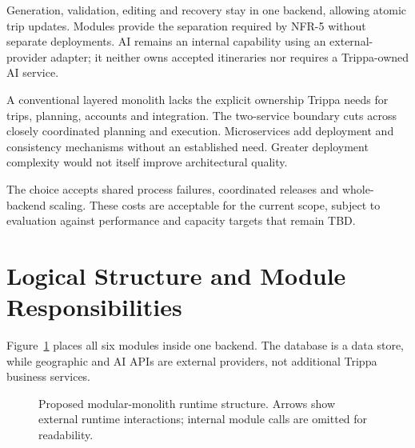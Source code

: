 Generation, validation, editing and recovery stay in one backend, allowing atomic trip updates. Modules provide the separation required by NFR-5 without separate deployments. AI remains an internal capability using an external-provider adapter; it neither owns accepted itineraries nor requires a Trippa-owned AI service.

A conventional layered monolith lacks the explicit ownership Trippa needs for trips, planning, accounts and integration. The two-service boundary cuts across closely coordinated planning and execution. Microservices add deployment and consistency mechanisms without an established need. Greater deployment complexity would not itself improve architectural quality.

The choice accepts shared process failures, coordinated releases and whole-backend scaling. These costs are acceptable for the current scope, subject to evaluation against performance and capacity targets that remain TBD.

\section{Logical Structure and Module Responsibilities}
Figure~\ref{fig:system-overview} places all six modules inside one backend. The database is a data store, while geographic and AI APIs are external providers, not additional Trippa business services.

\begin{figure}[htbp]
\centering

\caption{Proposed modular-monolith runtime structure. Arrows show external runtime interactions; internal module calls are omitted for readability.}
\label{fig:system-overview}
\end{figure}


